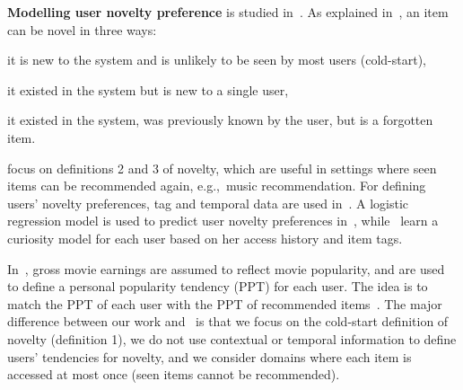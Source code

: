 \vspace{2mm}
\noindent \textbf{Modelling user novelty preference} is studied in~\cite{jambor2010optimizing,jugovac2017efficient,kapoor2015like,oh2011novel,Zhao:2016:MNR:2911451.2911488}.  As explained in~\cite{kapoor2015like}, an item can be novel in three ways: \begin{enumerate*}
\item it is new to the system and is unlikely to be seen by most users (cold-start), \item it existed in the system but is new to a single user, \item  it existed in the system, was previously known by the user, but is a forgotten item.
\end{enumerate*}
\cite{kapoor2015like,Zhao:2016:MNR:2911451.2911488} focus on definitions 2 and 3 of novelty, which are useful in settings where seen items can be recommended again, e.g.,~music recommendation. 
For defining users' novelty preferences, tag and temporal data are used in~\cite{kapoor2015like,Zhao:2016:MNR:2911451.2911488}.
\iffullpaper
A logistic regression model is used to predict user novelty preferences in~\cite{kapoor2015like}, while~\cite{Zhao:2016:MNR:2911451.2911488} learn  a curiosity model for each user based on her access history and item tags.
\fi
\iffalse
The curiosity model is a function of item novelties. The item  novelty for that user is defined based on the user's item access frequency, recency of access, and item tags. ~\cite{Zhao:2016:MNR:2911451.2911488} proposed a framework to accurately recommend items that the user is curious about. Gross movie earnings are used for defining users' tendencies for novelty in~\cite{oh2011novel}.  In particular, to measure the tendency of users toward popular items,~\cite{oh2011novel} define a notion of personal popularity tendency (PPT) per user using the average gross earnings of each movie and based on the past ratings of the user. The computation of PPT, however, is based on the  assumption that  the total earnings of a movie reflects its popularity. The idea is to match the PPT of each user with the PPT of recommended items, thereby increasing the novelty of recommendation lists in a targeted manner. 
\fi
In~\cite{oh2011novel}, gross movie earnings are assumed to reflect  movie popularity, and are used to define a personal popularity tendency (PPT) for each user. The idea is to match the PPT of each user with the PPT of recommended items~\cite{oh2011novel}. 
The major difference between our work and~\cite{kapoor2015like,oh2011novel,Zhao:2016:MNR:2911451.2911488} is that we focus on the  cold-start definition of novelty (definition 1), we do not use contextual or temporal information to define users' tendencies for novelty, and we consider domains where  each item is accessed at most once (seen items cannot be recommended). 


